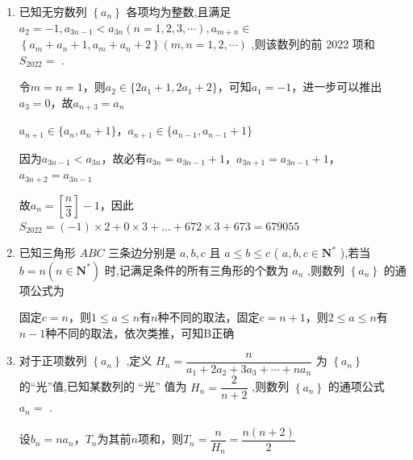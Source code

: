 \begin{enumerate}
\begin{jieda}
\begin{dingautolist}{172}
            ${a}_{3} = \dfrac{1}{a} \cdot  2max \{ 1,2\}  = \dfrac{4}{a} \leq  2,{a}_{4} = 2max \left\{  {\dfrac{4}{a},2}\right\}   = 4,{a}_{5} = \dfrac{a}{4} \cdot  2max \{ 4,2\}  = {2a} \geq  4$
            
            ${a}_{6} = \dfrac{1}{4} \cdot  2max \{ {2a},2\}  = a,{a}_{7} = \dfrac{1}{2a} \cdot  2max \{ a,2\}  = 1,{a}_{8} = \dfrac{1}{a} \cdot  2max \{ 1,2\}  = \dfrac{4}{a},\cdots$
            
            由上可知,对任意的 $n \in  {{N}}^{ * },{a}_{n + 5} = {a}_{n}$ ,
            所以, ${a}_{2020} = {a}_{5}$ ,即 ${4a} = {2a}$ ,解得 $a = 0$ ,不合乎题意.
        \end{dingautolist}
        综上所述, ${S}_{2022} = {7274}$ .
    \end{jieda}
    \item 已知无穷数列 $\left\{  {a}_{n}\right\}$ 各项均为整数,且满足 ${a}_{2} =  - 1,{a}_{{3n} - 1} < {a}_{3n}\left( {n = 1,2,3,\cdots }\right) ,{a}_{m + n} \in$  $\left\{  {{a}_{m} + {a}_{n} + 1,{a}_{m} + {a}_{n} + 2}\right\}  \left( {m,n = 1,2,\cdots }\right)$ ,则该数列的前 2022 项和 ${S}_{2022} =$ .
    \begin{jieda}
        令$m = n = 1$，则$a_2 \in \{2a_1 + 1, 2a_1+2\}$，可知$a_1 = -1$，进一步可以推出$a_3 = 0$，故$a_{n+3} = a_n$

        $a_{n+1} \in \{a_n, a_n+1\}$，$a_{n+1} \in \{a_{n-1}, a_{n-1}+1\}$

        因为${a}_{{3n} - 1} < {a}_{3n}$，故必有$a_{3n} = a_{3n-1} + 1$，$a_{3n+1} = a_{3n-1} + 1$，$a_{3n+2} = a_{3n-1}$

        故$a_n = \left[\dfrac{n}{3}\right] - 1$，因此$S_{2022} = (-1)\times 2 + 0 \times 3 + ... + 672 \times 3 + 673 = 679055$
    \end{jieda}
    \item 已知三角形 ${ABC}$ 三条边分别是 $a,b,c$ 且 $a \leq  b \leq  c$ ( $a,b,c \in  {\mathbf{N}}^{ * }$ ),若当 $b = n\left( {n \in  {\mathbf{N}}^{ * }}\right)$ 时,记满足条件的所有三角形的个数为 ${a}_{n}$ ,则数列 $\left\{  {a}_{n}\right\}$ 的通项公式为
    \begin{jieda}
        固定$c = n$，则$1 \leq a \leq n$有$n$种不同的取法，固定$c = n+1$，则$2 \leq a \leq n$有$n-1$种不同的取法，依次类推，可知B正确
    \end{jieda}
    \item 对于正项数列 $\left\{  {a}_{n}\right\}$ ,定义 ${H}_{n} = \dfrac{n}{{a}_{1} + 2{a}_{2} + 3{a}_{3} + \cdots  + n{a}_{n}}$ 为 $\left\{  {a}_{n}\right\}$ 的“光”值,已知某数列的 “光” 值为 ${H}_{n} = \dfrac{2}{n + 2}$ ,则数列 $\left\{  {a}_{n}\right\}$ 的通项公式 ${a}_{n} =$ .
    \begin{jieda}
        设$b_n = na_n$，$T_n$为其前$n$项和，则$T_n = \dfrac{n}{H_n} = \dfrac{n(n+2)}{2}$


\end{jieda}
\end{enumerate}

